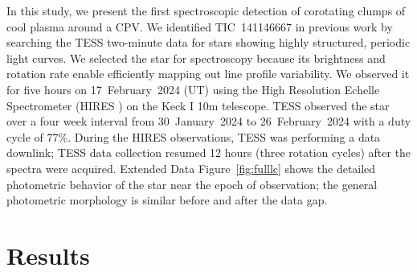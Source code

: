 \documentclass{nature3}
\begin{document}
In this study, we present the first spectroscopic detection of corotating clumps of
cool plasma around a CPV.  We identified TIC~141146667 in previous
work \cite{Bouma2024} by searching the TESS two-minute data
\cite{Ricker2015} for stars showing highly structured, periodic light
curves.  We selected the star for spectroscopy because its
brightness and rotation rate enable efficiently mapping out line
profile variability.  We observed it for five hours on 17~February~2024
(UT) using the High Resolution Echelle Spectrometer (HIRES
\cite{vogt_hires_1994}) on the Keck I 10m telescope.  TESS observed
the star over a four week interval from 30~January~2024 to
26~February~2024 with a duty cycle of 77\%.  During the HIRES
observations, TESS was performing a data downlink; TESS data
collection resumed 12 hours (three rotation cycles) after the spectra
were acquired.  Extended Data Figure~\ref{fig:fulllc} shows the
detailed photometric behavior of the star near the
epoch of observation; the general photometric morphology is similar
before and after the data gap.


\section{Results}
\end{document}
